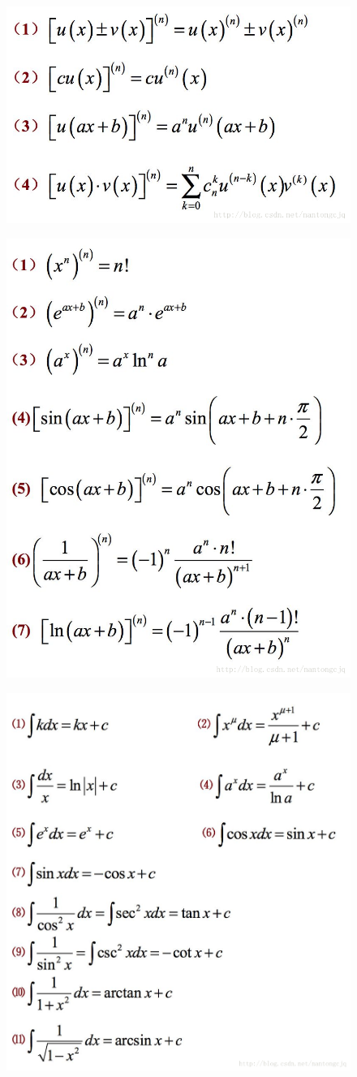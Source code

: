 \documentclass[a4paper,13.6pt]{article}
\begin{document}
\begin{CJK}{UTF8}{gbsn}
\begin{figure}[!htb]
\begin{center}
        \includegraphics[width=0.50\linewidth]{../scoure/6.png}
      \end{center}
    \end{figure}
    \begin{figure}[!htb]
      \begin{center}
        \includegraphics[width=0.50\linewidth]{../scoure/7.png}
      \end{center}
    \end{figure}
    \begin{figure}[!htb]
      \begin{center}
        \includegraphics[width=0.50\linewidth]{../scoure/10.png}

\end{center}
\end{figure}
\end{CJK}
\end{document}
